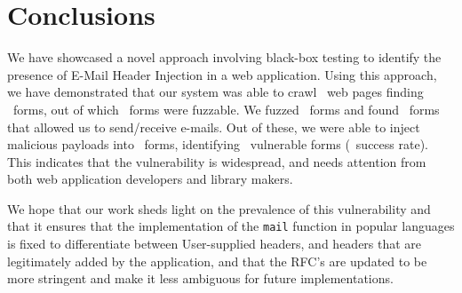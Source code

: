 \section{Conclusions}
We have showcased a novel approach involving black-box testing to identify the presence of E-Mail Header Injection in a web application. Using this approach, we have demonstrated that our system was able to crawl \urls\ web pages finding \forms\ forms, out of which \emailforms\ forms were fuzzable. We fuzzed \fuzzed\ forms and found \recd\  forms that allowed us to send/receive e-mails. Out of these, we were able to inject malicious payloads into \malfuzzed\ forms, identifying \success\ vulnerable forms (\successDelta\ success rate). This indicates that the vulnerability is widespread, and needs attention from both web application developers and library makers. 

We hope that our work sheds light on the prevalence of this vulnerability and that it ensures that the implementation of the \texttt{mail} function in popular languages is fixed to differentiate between User-supplied headers, and headers that are legitimately added by the application, and that the RFC's are updated to be more stringent and make it less ambiguous for future implementations. 